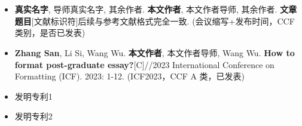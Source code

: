\chapter*{}


\vskip 5mm

\begin{itemize}
 \item \ifnotanonymous \textbf{真实名字}, 导师真实名字, 其余作者. \else \textbf{本文作者}, 本文作者导师, 其余作者. \fi \textbf{文章题目}[文献标识符]后续与参考文献格式完全一致. (会议缩写+发布时间，CCF类别，是否已发表)
 \item \ifnotanonymous \textbf{Zhang San}, Li Si, Wang Wu. \else \textbf{本文作者}, 本文作者导师, Wang Wu. \fi \textbf{How to format post-graduate essay?}[C]//2023 International Conference on Formatting (ICF). 2023: 1-12. (ICF2023，CCF A 类，已发表)
\end{itemize}

\bigskip\bigskip


\vskip 5mm

\begin{itemize}
  \item 发明专利1
  \item 发明专利2
\end{itemize}



\bigskip\bigskip\bigskip
